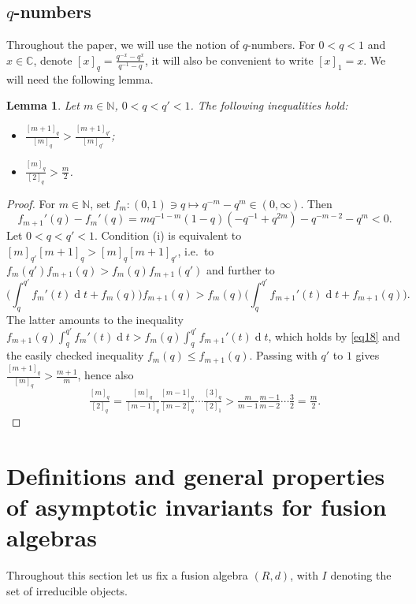 \documentclass[11 pt, leqno]{amsart}
\newcommand{\md}{\operatorname{d}\!}
\newcommand{\NN}{\mathbb{N}}
\newtheorem{lemma}[theorem]{Lemma}
\theoremstyle{definition}
\numberwithin{equation}{section}
\begin{document}
\subsection{$q$-numbers} 
 
Throughout the paper, we will use the notion of $q$-numbers. For $0<q<1$ and $x\in \mathbb{C}$, denote $[x]_q=\tfrac{q^{-x}-q^x}{q^{-1}-q}$, it will also be convenient to write $[x]_1=x$. We will need the following lemma.

\begin{lemma}\label{lemma9}
Let $m\in\NN$, $0<q<q'<1$. The following inequalities hold:
\begin{itemize}
\item[(i)] $\tfrac{[m+1]_q}{[m]_q} > \tfrac{[m+1]_{q'}}{[m]_{q'}}$;
\item[(ii)] $\tfrac{[m]_q}{[2]_q} > \tfrac{m}{2}$.
\end{itemize}
\end{lemma}

\begin{proof}
For $m\in\NN$, set $f_m\colon (0,1)\ni q\mapsto q^{-m}-q^m\in (0,\infty)$. Then 
\begin{equation}\label{eq18}
f_{m+1}'(q)-f_m'(q)=mq^{-1-m} (1-q) (-q^{-1}+q^{2m})-q^{-m-2}-  q^m <0.
\end{equation}
Let $0<q<q'<1$. Condition (i) is equivalent to $[m]_{q'} [m+1]_q > [m]_q [m+1]_{q'}$, i.e.\ to $f_m(q') f_{m+1}(q) > f_m(q) f_{m+1}(q')$ and further to
\[
\bigl( \int_{q}^{q'} f_{m}'(t)\md t +f_m(q)\bigr) f_{m+1}(q) > f_m(q)\bigl( \int_{q}^{q'} f_{m+1}'(t)\md t +f_{m+1}(q)\bigr).
\]
The latter amounts to the inequality $f_{m+1}(q) \int_{q}^{q'}f_m'(t)\md t > f_m(q) \int_{q}^{q'} f_{m+1}'(t)\md t$, which holds by \eqref{eq18} and the easily checked inequality $f_m(q)\le f_{m+1}(q)$. Passing with $q'$ to $1$ gives $\tfrac{[m+1]_q}{[m]_q} > \tfrac{m+1}{m}$, hence also
\[
\tfrac{[m]_q}{[2]_q} = 
\tfrac{[m]_q}{[m-1]_q} \tfrac{ [m-1]_q }{[m-2]_q}\cdots \tfrac{[3]_q}{[2]_1} > 
\tfrac{m}{m-1} \tfrac{ m-1 }{m-2}\cdots \tfrac{3}{2}=
\tfrac{m}{2}.
\]
\end{proof}

\section{Definitions and general properties of asymptotic invariants for fusion algebras}
\label{sec:asymptotic}

Throughout this section let us fix a fusion algebra $(R,d)$, with $I$ denoting the set of irreducible objects.
\end{document}

